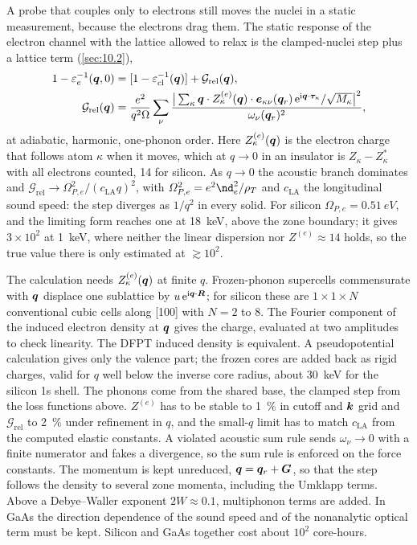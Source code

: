 A probe that couples only to electrons still moves the nuclei in a static measurement, because the electrons drag them. The static response of the electron channel with the lattice allowed to relax is the clamped-nuclei step plus a lattice term (\cref{sec:10.2}),
\begin{align}
  1 - \varepsilon_e^{-1}(\bm{q},0) &= [1 - \varepsilon^{-1}_{\mathrm{cl}}(\bm{q})] + \mathcal{G}_{\mathrm{rel}}(\bm{q}) , \nonumber\\
  \mathcal{G}_{\mathrm{rel}}(\bm{q}) &= \frac{e^2}{q^2\Omega}\sum_\nu\frac{\big|\sum_\kappa\bm{q}\cdot Z^{(e)}_\kappa(\bm{q})\cdot\bm{e}_{\kappa\nu}(\bm{q}_r)\,\mathrm{e}^{\mathrm{i}\bm{q}\cdot\bm{\tau}_\kappa}/\sqrt{M_\kappa}\big|^2}{\omega_\nu(\bm{q}_r)^2} ,
  \label{eq:E.16-step}
\end{align}
at adiabatic, harmonic, one-phonon order. Here $Z^{(e)}_\kappa(\bm{q})$ is the electron charge that follows atom $\kappa$ when it moves, which at $q\to0$ in an insulator is $Z_\kappa - Z^*_\kappa$ with all electrons counted, 14 for silicon. As $q\to0$ the acoustic branch dominates and $\mathcal{G}_{\mathrm{rel}} \to \varOmega_{P,e}^2/(c_{\mathrm{LA}}q)^2$, with $\varOmega_{P,e}^2 = e^2\nd_e^2/\rho_T$ and $c_{\mathrm{LA}}$ the longitudinal sound speed: the step diverges as $1/q^2$ in every solid. For silicon $\varOmega_{P,e} = \SI{0.51}{eV}$, and the limiting form reaches one at \SI{18}{keV}, above the zone boundary; it gives $3\times10^2$ at \SI{1}{keV}, where neither the linear dispersion nor $Z^{(e)} \approx 14$ holds, so the true value there is only estimated at $\gtrsim10^2$.

The calculation needs $Z^{(e)}_\kappa(\bm{q})$ at finite $q$. Frozen-phonon supercells commensurate with $\bm{q}$ displace one sublattice by $u\,\mathrm{e}^{\mathrm{i}\bm{q}\cdot\bm{R}}$; for silicon these are $1\times1\times N$ conventional cubic cells along [100] with $N = 2$ to 8. The Fourier component of the induced electron density at $\bm{q}$ gives the charge, evaluated at two amplitudes to check linearity. The DFPT induced density is equivalent. A pseudopotential calculation gives only the valence part; the frozen cores are added back as rigid charges, valid for $q$ well below the inverse core radius, about \SI{30}{keV} for the silicon 1s shell. The phonons come from the shared base, the clamped step from the loss functions above. $Z^{(e)}$ has to be stable to \SI{1}{\percent} in cutoff and $\bm{k}$ grid and $\mathcal{G}_{\mathrm{rel}}$ to \SI{2}{\percent} under refinement in $q$, and the small-$q$ limit has to match $c_{\mathrm{LA}}$ from the computed elastic constants. A violated acoustic sum rule sends $\omega_\nu \to 0$ with a finite numerator and fakes a divergence, so the sum rule is enforced on the force constants. The momentum is kept unreduced, $\bm{q} = \bm{q}_r + \bm{G}$, so that the step follows the density to several zone momenta, including the Umklapp terms. Above a Debye--Waller exponent $2W \approx 0.1$, multiphonon terms are added. In GaAs the direction dependence of the sound speed and of the nonanalytic optical term must be kept. Silicon and GaAs together cost about $10^2$ core-hours.

